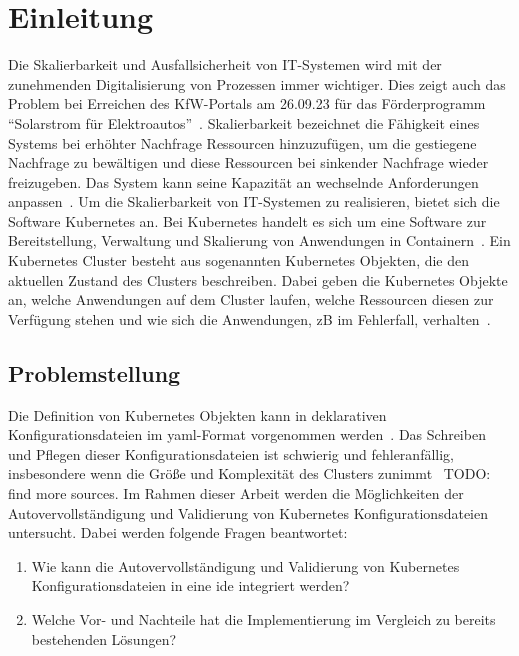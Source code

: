 \chapter{Einleitung}\label{ch:introduction}

Die Skalierbarkeit und Ausfallsicherheit von IT-Systemen wird mit der zunehmenden Digitalisierung von Prozessen immer wichtiger.
Dies zeigt auch das Problem bei Erreichen des KfW-Portals am 26.09.23 für das Förderprogramm ``Solarstrom für Elektroautos''~\cite{kfw-not-reachable}.
Skalierbarkeit bezeichnet die Fähigkeit eines Systems bei erhöhter Nachfrage Ressourcen hinzuzufügen, um die gestiegene Nachfrage zu bewältigen und
diese Ressourcen bei sinkender Nachfrage wieder freizugeben. Das System kann seine Kapazität an wechselnde Anforderungen anpassen~\cite{it-system-scaling}.
Um die Skalierbarkeit von IT-Systemen zu realisieren, bietet sich die Software Kubernetes an.
Bei Kubernetes handelt es sich um eine Software zur Bereitstellung, Verwaltung und Skalierung von Anwendungen in Containern~\cite{kubernetes-overview}.
Ein Kubernetes Cluster besteht aus sogenannten Kubernetes Objekten, die den aktuellen Zustand des Clusters beschreiben. Dabei geben die Kubernetes Objekte an,
welche Anwendungen auf dem Cluster laufen, welche Ressourcen diesen zur Verfügung stehen und wie sich die Anwendungen, \acs{zB} im Fehlerfall, verhalten~\cite{kubernetes-objects}.

\section{Problemstellung}\label{sec:problem}

Die Definition von Kubernetes Objekten kann in deklarativen Konfigurationsdateien im \acs{yaml}-Format vorgenommen werden~\cite{kubernetes-config-declarative}.
Das Schreiben und Pflegen dieser Konfigurationsdateien ist schwierig und fehleranfällig, insbesondere wenn die Größe und Komplexität des Clusters zunimmt~\cite{kubernetes-config-problems} TODO: find more sources.
Im Rahmen dieser Arbeit werden die Möglichkeiten der Autovervollständigung und Validierung von Kubernetes Konfigurationsdateien untersucht.
Dabei werden folgende Fragen beantwortet:
\begin{enumerate}
    \item Wie kann die Autovervollständigung und Validierung von Kubernetes Konfigurationsdateien in eine \acs{ide} integriert werden?
    \item Welche Vor- und Nachteile hat die Implementierung im Vergleich zu bereits bestehenden Lösungen?
\end{enumerate}

